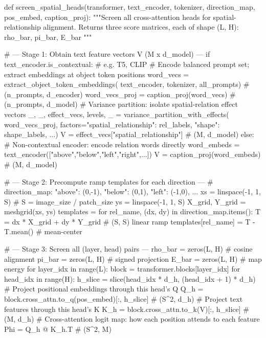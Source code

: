 \documentclass[10pt,twocolumn,letterpaper]{article}
\begin{document}
\vspace{-15pt}
\begin{RoundedListing}[basicstyle=\fontsize{8}{9}\selectfont\ttfamily\color{atomForeground}]
def screen_spatial_heads(transformer, text_encoder, tokenizer,
                         direction_map, pos_embed, caption_proj):
    """Screen all cross-attention heads for spatial-relationship alignment.
    Returns three score matrices, each of shape (L, H): rho_bar, pi_bar, E_bar  """

    # --- Stage 1: Obtain text feature vectors V (M x d_model) ---
    if text_encoder.is_contextual:  # e.g. T5, CLIP
        # Encode balanced prompt set; extract embeddings at object token positions
        word_vecs = extract_object_token_embeddings(
            text_encoder, tokenizer, all_prompts)   # (n_prompts, d_encoder)
        word_vecs_proj = caption_proj(word_vecs)     # (n_prompts, d_model)
        # Variance partition: isolate spatial-relation effect vectors
        _, _, effect_vecs, levels, _ = variance_partition_with_effects(
            word_vecs_proj,
            factors={"spatial_relationship": rel_labels,
                     "shape": shape_labels, ...})
        V = effect_vecs["spatial_relationship"]      # (M, d_model)
    else:
        # Non-contextual encoder: encode relation words directly
        word_embeds = text_encoder(["above","below","left","right",...])
        V = caption_proj(word_embeds)                # (M, d_model)

    # --- Stage 2: Precompute ramp templates for each direction ---
    # direction_map: {"above": (0,-1), "below": (0,1), "left": (-1,0), ...}
    xs = linspace(-1, 1, S)  # S = image_size / patch_size
    ys = linspace(-1, 1, S)
    X_grid, Y_grid = meshgrid(xs, ys)
    templates = {}
    for rel_name, (dx, dy) in direction_map.items():
        T = dx * X_grid + dy * Y_grid   # (S, S) linear ramp
        templates[rel_name] = T - T.mean()  # mean-center

    # --- Stage 3: Screen all (layer, head) pairs ---
    rho_bar = zeros(L, H)   # cosine alignment
    pi_bar  = zeros(L, H)   # signed projection
    E_bar   = zeros(L, H)   # map energy
    for layer_idx in range(L):
        block = transformer.blocks[layer_idx]
        for head_idx in range(H):
            h_slice = slice(head_idx * d_h, (head_idx + 1) * d_h)
            # Project positional embeddings through this head's Q
            Q_h = block.cross_attn.to_q(pos_embed)[:, h_slice]  # (S^2, d_h)
            # Project text features through this head's K
            K_h = block.cross_attn.to_k(V)[:, h_slice]          # (M, d_h)
            # Cross-attention logit map: how each position attends to each feature
            Phi = Q_h @ K_h.T                                   # (S^2, M)


\end{RoundedListing}
\end{document}
